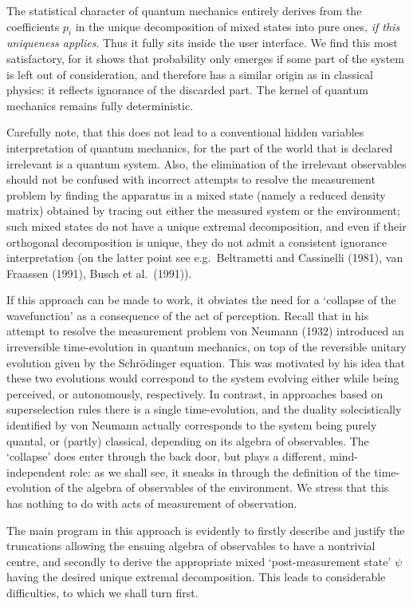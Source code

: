 The statistical character of quantum mechanics entirely derives from the
coefficients $p_i$ in the
unique decomposition of mixed states into pure ones, {\em if this uniqueness
applies}. Thus it fully
sits inside the user interface. We find this most satisfactory, for it  shows
that probability only
emerges if some part of the system is left out of consideration, and therefore
has a similar
origin as in classical physics: it reflects ignorance   of the discarded part.
 The kernel
of quantum mechanics remains fully deterministic.

 Carefully note, that this does not lead to a
conventional hidden variables interpretation of quantum mechanics, for the part
of the world that is
declared irrelevant is  a quantum system. Also, the elimination of the
irrelevant
observables should not be confused with incorrect attempts to resolve the
measurement problem by
finding the apparatus in a mixed state (namely a reduced density matrix)
obtained by tracing out
either the measured system or the environment; such mixed states do not have a
unique
extremal decomposition, and even if their orthogonal decomposition is unique,
they do not admit a
consistent ignorance interpretation (on the latter point see e.g.\ Beltrametti
and Cassinelli
(1981), van Fraassen (1991), Busch et al.\ (1991)).


If this approach can be made to work, it obviates the need for a `collapse of
the wavefunction' as a
consequence of the act of perception. Recall that in his attempt to resolve the
measurement problem
von Neumann (1932)   introduced an irreversible time-evolution in quantum
mechanics, on top of the reversible unitary evolution given by the
Schr\"{o}dinger equation.
This was motivated by his idea that these two evolutions would  correspond to
the system evolving either
while being perceived, or autonomously, respectively. In contrast, in
approaches based on
superselection rules there is a single time-evolution, and the duality
solecistically identified by von
Neumann actually corresponds to the system being purely quantal, or (partly)
classical, depending
on its algebra of observables. The `collapse' does enter through the back door,
but plays a
different, mind-independent role: as we shall see, it sneaks in through the
definition of the
time-evolution of the algebra of observables of the environment. We stress that
this has nothing to
do with acts of measurement of observation.

The main program in this approach is evidently to firstly describe and justify
the truncations
allowing the ensuing algebra of observables to have a nontrivial centre, and
secondly to derive the
appropriate mixed `post-measurement state' $\psi$ having the desired unique
extremal decomposition.
This leads to considerable difficulties, to which we shall turn first.
